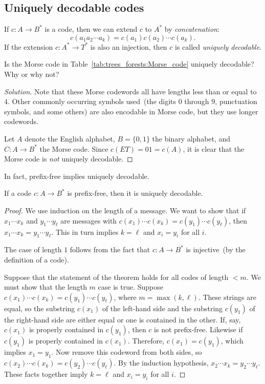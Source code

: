 
\subsection{Uniquely decodable codes}

If $c: A \to B^*$ is a code, then we can extend $c$ to
$A^*$ by \emph{concatenation}:
\[
c(a_1 a_2 \cdots a_k)
=
c(a_1) c(a_2) \cdots c(a_k).
\]
If the extension $c: A^* \to T^*$ is also an injection,
then $c$ is called \emph{uniquely decodable}.

\begin{example}
Is the Morse code in
Table~\ref{tab:trees_forests:Morse_code} uniquely decodable? Why or
why not?
\end{example}

\begin{proof}[Solution]
Note that these Morse codewords all have lengths less than or equal to
$4$. Other commonly occurring symbols used~(the digits $0$ through
$9$, punctuation symbols, and some others) are also encodable in Morse
code, but they use longer codewords.

Let $A$ denote the English alphabet, $B = \{0, 1\}$ the binary
alphabet, and $C: A \to B^*$ the Morse code. Since
$c(ET) = 01 = c(A)$, it is clear that the Morse code is \emph{not}
uniquely decodable.
\end{proof}

In fact, prefix-free implies uniquely decodable.

\begin{theorem}
If a code $c: A \to B^*$ is prefix-free, then it is
uniquely decodable.
\end{theorem}

\begin{proof}
We use induction on the length of a message. We want to show that if
$x_1 \cdots x_k$ and $y_1 \cdots y_\ell$ are messages with
$c(x_1) \cdots c(x_k) = c(y_1) \cdots c(y_\ell)$, then
$x_1 \cdots x_k = y_1 \cdots y_\ell$. This in turn implies $k = \ell$
and $x_i = y_i$ for all $i$.

The case of length $1$ follows from the fact that
$c: A \to B^*$ is injective~(by the definition of a
code).

Suppose that the statement of the theorem holds for all
codes of length $< m$. We must show that the length $m$ case is
true. Suppose $c(x_1) \cdots c(x_k) = c(y_1) \cdots c(y_\ell)$, where
$m = \max(k, \ell)$. These strings are equal, so the substring
$c(x_1)$ of the left-hand side and the substring $c(y_1)$ of the
right-hand side are either equal or one is contained in the other. If,
say, $c(x_1)$ is properly contained in $c(y_1)$, then $c$ is not
prefix-free. Likewise if $c(y_1)$ is properly contained in
$c(x_1)$. Therefore, $c(x_1) = c(y_1)$, which implies $x_1 = y_1$. Now
remove this codeword from both sides, so
$c(x_2) \cdots c(x_k) = c(y_2) \cdots c(y_\ell)$. By the induction
hypothesis, $x_2 \cdots x_k = y_2 \cdots y_\ell$. These facts together
imply $k = \ell$ and $x_i = y_i$ for all $i$.
\end{proof}

